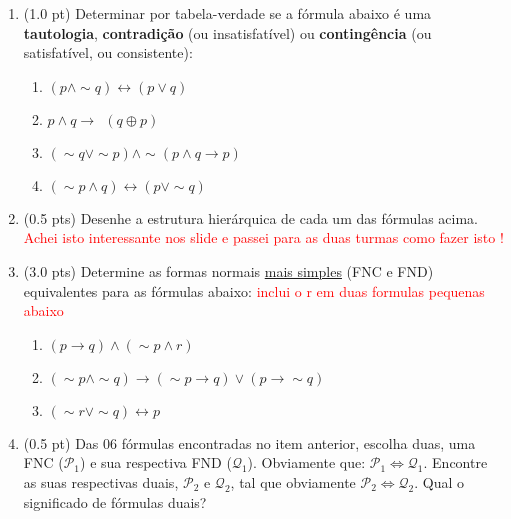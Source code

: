 \documentclass[12pt]{article}
\begin{document}
\begin{enumerate}
\itemsep 15pt
\item (1.0 pt) Determinar por tabela-verdade se a fórmula abaixo é uma {\bf tautologia}, {\bf contradição} (ou insatisfatível) ou {\bf contingência} (ou satisfatível, ou consistente): 

\begin{enumerate}
\setlength{\itemsep}{-2pt}
\item $(p \wedge \sim q) \leftrightarrow  (p \vee q) $

\item $p \wedge q \rightarrow ~~(q \oplus p)$

\item $ (\sim q \vee \sim p) \wedge \sim (p \wedge q \rightarrow p) $ 

\item $(\sim p \wedge q) \leftrightarrow ( p \vee \sim q)$ 

\end{enumerate}

\item (0.5 pts) Desenhe a estrutura hierárquica de cada um das fórmulas acima.
\textcolor{red}{Achei isto interessante nos slide e passei para as duas turmas como fazer isto !}

\item (3.0 pts) Determine as formas normais \underline{mais simples} (FNC e FND) equivalentes para as fórmulas abaixo: 
\textcolor{red}{inclui o r em duas formulas pequenas abaixo}
\begin{enumerate}
\setlength{\itemsep}{-2pt}

\item $(p \rightarrow q)  \wedge 
 (\sim p \wedge r) $

\item $(\sim p \wedge \sim q) \rightarrow (\sim p \rightarrow  q) \vee  ( p \rightarrow  \sim q)$

\item $(\sim r \vee \sim q) \leftrightarrow p $


\end{enumerate}

\item (0.5 pt) Das 06 fórmulas
encontradas no item anterior, escolha duas, uma 
FNC ($\mathcal{P}_1$) e sua respectiva FND ($\mathcal{Q}_1$). Obviamente que: $\mathcal{P}_1 \Leftrightarrow \mathcal{Q}_1$. 
Encontre as suas respectivas duais, $\mathcal{P}_2$ e $\mathcal{Q}_2$,  tal que obviamente  $\mathcal{P}_2 \Leftrightarrow \mathcal{Q}_2$. Qual o significado de fórmulas duais?



\end{enumerate}
\end{document}
